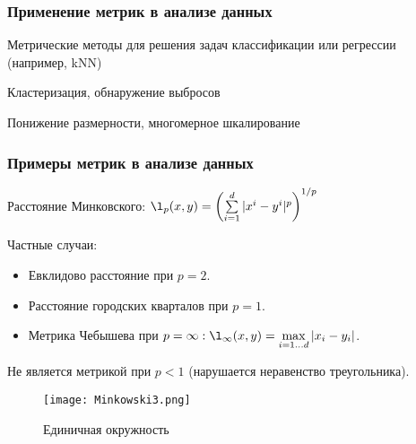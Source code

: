 \documentclass[10pt]{beamer}
\begin{document}

\begin{frame}
\frametitle{Применение метрик в анализе данных}
Метрические методы для решения задач классификации или регрессии (например, kNN)

\vspace{\baselineskip}
Кластеризация, обнаружение выбросов

\vspace{\baselineskip}
Понижение размерности, многомерное шкалирование
\end{frame}


\begin{frame}
\frametitle{Примеры метрик в анализе данных}
	Расстояние Минковского: $\l_{p}(x, y) = \left( \sum\limits_{i = 1}^{d} |x^{i} - y^{i}|^{p} \right)^{1/p}$


	Частные случаи:
\begin{itemize}
	\item Евклидово расстояние при $p=2$.
	\item Расстояние городских кварталов при $p=1$.
	\item Метрика Чебышева при $p=\infty: \l_{\infty}(x, y) = \max\limits_{i=1...d} |x_{i} - y_{i}|$.
\end{itemize}	
	Не является метрикой при $p < 1$ (нарушается неравенство треугольника).
\begin{figure}
  \texttt{[image: Minkowski3.png]}
  \caption{Единичная окружность}
\end{figure}
\end{frame}

\end{document}
